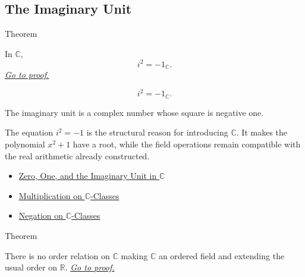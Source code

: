 \subsection*{The Imaginary Unit}

\begin{theorembox}{Theorem}
\begin{theorem}
\label{thm:i-squared-negative-one}
In \(\mathbb{C}\),
\[
i^2=-1_{\mathbb{C}}.
\]
\hyperref[prf:i-squared-negative-one]{\textit{Go to proof.}}
\end{theorem}
\end{theorembox}


\begin{remark*}
\[
i^2=-1_{\mathbb{C}}.
\]
\end{remark*}

\begin{remark*}[Interpretation]
The imaginary unit is a complex number whose square is negative one.


The equation \(i^2=-1\) is the structural reason for introducing
\(\mathbb{C}\). It makes the polynomial \(x^2+1\) have a root, while the field
operations remain compatible with the real arithmetic already constructed.
\end{remark*}

\begin{dependencies}
\begin{itemize}
  \item \hyperref[def:zero-one-i-in-c]{Zero, One, and the Imaginary Unit in $\mathbb{C}$}
  \item \hyperref[def:multiplication-on-c-classes]{Multiplication on $\mathbb{C}$-Classes}
  \item \hyperref[def:negation-on-c-classes]{Negation on $\mathbb{C}$-Classes}
\end{itemize}
\end{dependencies}

\begin{theorembox}{Theorem}
\begin{theorem}
\label{thm:c-is-not-an-ordered-field}
There is no order relation on \(\mathbb{C}\) making \(\mathbb{C}\) an ordered
field and extending the usual order on \(\mathbb{R}\).
\hyperref[prf:c-is-not-an-ordered-field]{\textit{Go to proof.}}
\end{theorem}
\end{theorembox}

